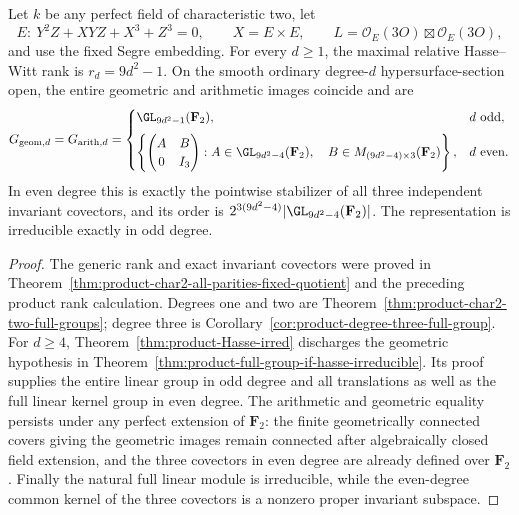 \begin{corollary}
\label{thm:product-char2-all-full-groups}
Let $k$ be any perfect field of characteristic two, let
\[
 E:\ Y^2Z+XYZ+X^3+Z^3=0,\qquad
 X=E\times E,\qquad
 L=\mathcal O_E(3O)\boxtimes\mathcal O_E(3O),
\]
and use the fixed Segre embedding. For every $d\ge1$, the
maximal relative Hasse--Witt rank is $r_d=9d^2-1$. On the smooth
ordinary degree-$d$ hypersurface-section open, the entire
geometric and arithmetic images coincide and are
\[
 G_{{\rm geom},d}=G_{{\rm arith},d}=
 \begin{cases}
 \GL_{9d^2-1}(\mathbf F_2),&d\text{ odd},\\[2mm]
 \left\{\begin{pmatrix}A&B\\0&I_3\end{pmatrix}:
 A\in\GL_{9d^2-4}(\mathbf F_2),\quad
 B\in M_{(9d^2-4)\times3}(\mathbf F_2)\right\},&d\text{ even}.
 \end{cases}
\]
In even degree this is exactly the pointwise stabilizer of all
three independent invariant covectors, and its order is
$2^{3(9d^2-4)}|\GL_{9d^2-4}(\mathbf F_2)|$.
The representation is irreducible exactly in odd degree.
\end{corollary}

\begin{proof}
The generic rank and exact invariant covectors were proved in
Theorem~\ref{thm:product-char2-all-parities-fixed-quotient} and
the preceding product rank calculation. Degrees one and two
are Theorem~\ref{thm:product-char2-two-full-groups}; degree three
is Corollary~\ref{cor:product-degree-three-full-group}.
For $d\ge4$, Theorem~\ref{thm:product-Hasse-irred} discharges the
geometric hypothesis in
Theorem~\ref{thm:product-full-group-if-hasse-irreducible}.
Its proof supplies the entire linear group in odd degree and
all translations as well as the full linear kernel group in
even degree. The arithmetic and geometric equality persists
under any perfect extension of $\mathbf F_2$: the finite
geometrically connected covers giving the geometric images
remain connected after algebraically closed field extension,
and the three covectors in even degree are already defined
over $\mathbf F_2$. Finally the natural full linear module is
irreducible, while the even-degree common kernel of the three
covectors is a nonzero proper invariant subspace.
\end{proof}


